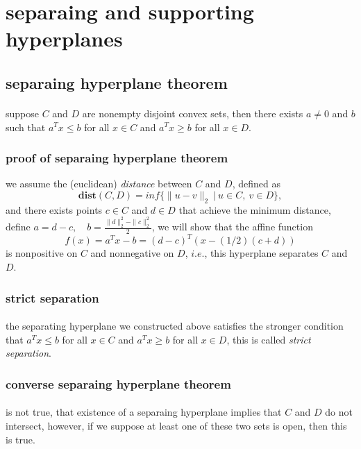 \documentclass{article}
\begin{document}
\section{separaing and supporting hyperplanes}
  \subsection{separaing hyperplane theorem}
    \paragraph{} suppose $C$ and $D$ are nonempty disjoint convex sets, then there exists $a \neq 0$ and $b$ such that $a^Tx \leq b$ for all $x \in C$ and $a^Tx \ge b$ for all $x \in D$.
    \subsubsection{proof of separaing hyperplane theorem}
      we assume the (euclidean) \textit{distance} between $C$ and $D$, defined as
      \begin{equation}
        \mathbf{dist}(C, D) = inf\{\|u - v\|_2 \ |\ u \in C,\ v \in D\},
      \end{equation}
      and there exists points $c \in C$ and $d \in D$ that achieve the minimum distance, define $a = d - c,\quad b = \frac{\|d\|_2^2 - \|c\|_2^2}{2}$, we will show that the affine function
      \begin{equation}
        f(x) = a^T x - b = (d - c)^T(x - (1/2)(c + d))
      \end{equation}
      is nonpositive on $C$ and nonnegative on $D$, $i.e.$, this hyperplane separates $C$ and $D$.
    \subsubsection{strict separation}
      \paragraph{} the separating hyperplane we constructed above satisfies the stronger condition that $a^Tx \le b$ for all $x \in C$ and $a^Tx \ge b$ for all $x \in D$, this is called \textit{strict separation}.
    \subsubsection{converse separaing hyperplane theorem}
      \paragraph{} is not true, that existence of a separaing hyperplane implies that $C$ and $D$ do not intersect, however, if we suppose at least one of these two sets is open, then this is true.
\end{document}
